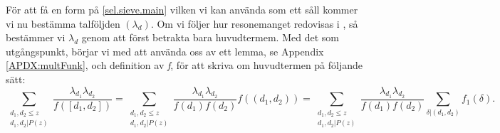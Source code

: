 För att få en form på \eqref{sel.sieve.main} vilken vi kan använda som ett såll kommer vi nu bestämma talföljden \((\lambda_d)\). 
Om vi följer hur resonemanget redovisas i \cite{cojocarumurty}, så bestämmer vi \(\lambda_d\) genom att först betrakta bara huvudtermem. 
 Med det som utgångspunkt, börjar vi med att använda oss av ett lemma, se Appendix \ref{APDX:multFunk}, och definition av \textit{f}, för att skriva om huvudtermen på följande sätt:
\begin{equation}
    \sum_{\substack{d_1,d_2\leq z\\d_1,d_2|P(z)}}\frac{\lambda_{d_1}\lambda_{d_2}}{f([d_1,d_2])} = \sum_{\substack{d_1,d_2\leq z\\d_1,d_2|P(z)}}\frac{\lambda_{d_1}\lambda_{d_2}}{f(d_1)f(d_2)}f((d_1,d_2)) = \sum_{\substack{d_1,d_2\leq z\\d_1,d_2|P(z)}}\frac{\lambda_{d_1}\lambda_{d_2}}{f(d_1)f(d_2)}\sum_{\delta|(d_1,d_2)}f_1(\delta).\label{sel.sieve.exchange}
\end{equation}

